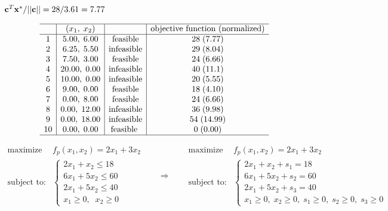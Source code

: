 \documentclass{article}
\def\lthtmlcheckvsize{\ifdim\ht\sizebox<\vsize 
  \ifdim\wd\sizebox<\hsize\expandafter\hfill\fi \expandafter\vfill
  \else\expandafter\vss\fi}%
\begin{document}
{\newpage\clearpage
{}%
$ {\bf c}^T{\bf x}^*/||{\bf c}||=28/3.61=7.77$%
\lthtmlindisplaymathZ
\lthtmlcheckvsize\clearpage}

{\newpage\clearpage
{}%
\begin{displaymath}\begin{array}{c|c|c|c}\hline
& (x_1,\; x_2) &  & \mbox{objective function (normalized)} \\\hline
1 & 5.00,\; 6.00 & \mbox{feasible}   & 28\; (7.77) \\
2 & 6.25,\; 5.50 & \mbox{infeasible} & 29\; (8.04) \\
3 & 7.50,\; 3.00 & \mbox{feasible}   & 24\; (6.66) \\
4 &20.00,\; 0.00 & \mbox{infeasible} & 40\; (11.1) \\
5 &10.00,\; 0.00 & \mbox{infeasible} & 20\; (5.55) \\
6 & 9.00,\; 0.00 & \mbox{feasible}   & 18\; (4.10) \\
7 & 0.00,\; 8.00 & \mbox{feasible}   & 24\; (6.66) \\
8 & 0.00,\; 12.00 & \mbox{infeasible}& 36\; (9.98) \\
9 & 0.00,\; 18.00 & \mbox{infeasible}& 54\; (14.99) \\
10& 0.00,\; 0.00 & \mbox{feasible }  &  0\; (0.00) \\\hline
\end{array}\end{displaymath}%
\lthtmldisplayZ
\lthtmlcheckvsize\clearpage}

{\newpage\clearpage
{}%
\begin{displaymath}\begin{array}{ll}
\mbox{maximize}    & f_p(x_1,x_2)=2x_1+3x_2 \\
\mbox{subject to:} &
\left\{ \begin{array}{l}
2x_1+ x_2 \le 18\\6x_1+5x_2 \le 60 \\2x_1+5x_2 \le 40 \\
x_1 \ge 0,\;\; x_2\ge 0
\end{array}\right.
\end{array}
\;\;\;\;\;\;\Longrightarrow\;\;\;\;\;\;
\begin{array}{ll}
\mbox{maximize}    & f_p(x_1,x_2)=2x_1+3x_2 \\
\mbox{subject to:} &
\left\{ \begin{array}{l}
2x_1+ x_2+s_1=18\\6x_1+5x_2+s_2=60 \\2x_1+5x_2+s_3=40 \\
x_1 \ge 0,\; x_2\ge 0,\; s_1\ge 0,\; s_2\ge 0,\; s_3\ge0
\end{array}\right.
\end{array}\end{displaymath}%
\lthtmldisplayZ
\lthtmlcheckvsize\clearpage}
\end{document}
